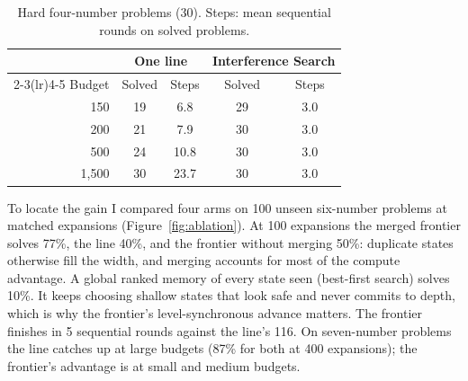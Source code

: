 \documentclass[10pt,twocolumn]{article}
\newcommand{\IS}{Interference Search}
\begin{document}
\begin{table}[t]
\centering\small
\begin{tabular}{rcccc}
\toprule
 & \multicolumn{2}{c}{One line} & \multicolumn{2}{c}{\IS} \\
\cmidrule(lr){2-3}\cmidrule(lr){4-5}
Budget & Solved & Steps & Solved & Steps \\
\midrule
150 & 19 & 6.8 & 29 & 3.0 \\
200 & 21 & 7.9 & 30 & 3.0 \\
500 & 24 & 10.8 & 30 & 3.0 \\
1,500 & 30 & 23.7 & 30 & 3.0 \\
\bottomrule
\end{tabular}
\caption{Hard four-number problems (30). Steps: mean sequential rounds on solved problems.}
\label{tab:bench}
\end{table}

To locate the gain I compared four arms on 100 unseen six-number problems at matched expansions (Figure~\ref{fig:ablation}). At 100 expansions the merged frontier solves 77\%, the line 40\%, and the frontier without merging 50\%: duplicate states otherwise fill the width, and merging accounts for most of the compute advantage. A global ranked memory of every state seen (best-first search) solves 10\%. It keeps choosing shallow states that look safe and never commits to depth, which is why the frontier's level-synchronous advance matters. The frontier finishes in 5 sequential rounds against the line's 116. On seven-number problems the line catches up at large budgets (87\% for both at 400 expansions); the frontier's advantage is at small and medium budgets.
\end{document}
